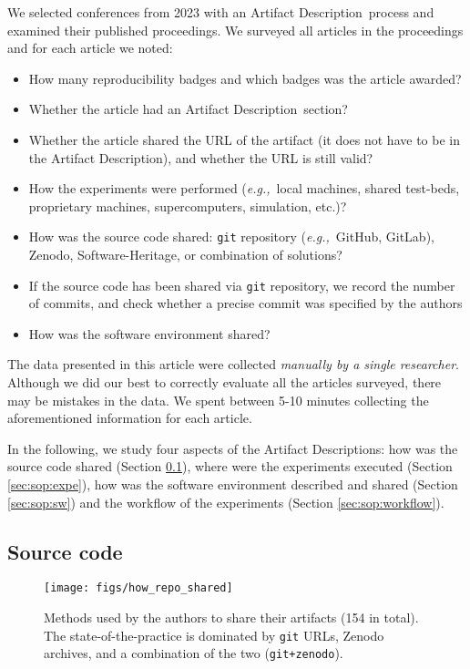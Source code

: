 \documentclass[sigconf,natbib=false]{acmart}
\newcommand{\eg}{\emph{e.g.,}}
\newcommand{\ad}{Artifact Description}
\begin{document}
We selected conferences from 2023 with an \ad\ process and examined their published proceedings.
We surveyed all articles in the proceedings and for each article we noted:

\begin{itemize}
  \item How many reproducibility badges and which badges was the article awarded?
  \item Whether the article had an \ad\ section?
  \item Whether the article shared the URL of the artifact (it does not have to be in the \ad), and whether the URL is still valid?
  \item How the experiments were performed (\eg\ local machines, shared test-beds, proprietary machines, supercomputers, simulation, etc.)?
  \item How was the source code shared: \texttt{git} repository (\eg\ GitHub, GitLab), Zenodo, Software-Heritage, or combination of solutions?
  \item If the source code has been shared via \texttt{git} repository, we record the number of commits, and check whether a precise commit was specified by the authors
  \item How was the software environment shared?
\end{itemize}

The data presented in this article were collected \emph{manually by a single researcher}.
Although we did our best to correctly evaluate all the articles surveyed, there may be mistakes in the data.
We spent between 5-10 minutes collecting the aforementioned information for each article.


In the following, we study four aspects of the \ad s: how was the source code shared (Section \ref{sec:sop:src}), where were the experiments executed (Section \ref{sec:sop:expe}), how was the software environment described and shared (Section \ref{sec:sop:sw}) and the workflow of the experiments (Section \ref{sec:sop:workflow}).

\subsection{Source code}\label{sec:sop:src}

\begin{figure}
  \centering
  \texttt{[image: figs/how\_repo\_shared]}
  \caption{Methods used by the authors to share their artifacts (154 in total).
  The state-of-the-practice is dominated by \texttt{git} URLs, Zenodo archives, and a combination of the two (\texttt{git+zenodo}).}\label{fig:how_repo_shared}
\end{figure}
\end{document}
